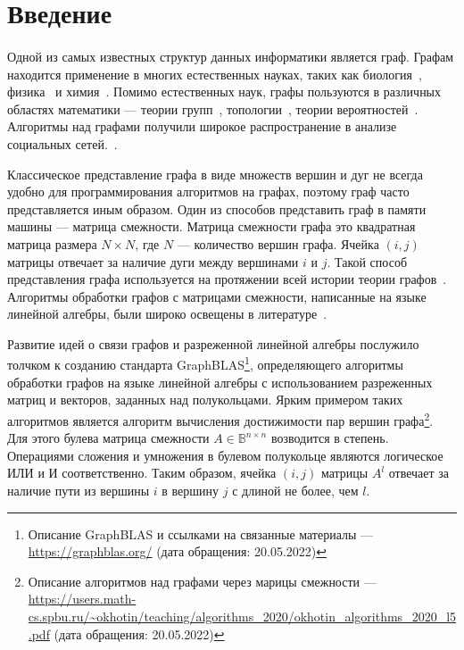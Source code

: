 \documentclass[14pt]{matmex-diploma-custom}
\begin{document}
\maketitle
\tableofcontents

\section*{Введение}
\paragraph{} Одной из самых известных структур данных информатики является граф. Графам находится применение в многих естественных науках, таких как биология~\cite{biology}, физика~\cite{physics} и химия~\cite{chemistry}. Помимо естественных наук, графы пользуются в различных областях математики --- теории групп~\cite{group}, топологии~\cite{topology}, теории вероятностей~\cite{probability}. Алгоритмы над графами получили широкое распространение в анализе социальных сетей.~\cite{social}.

Классическое представление графа в виде множеств вершин и дуг не всегда удобно для программирования алгоритмов на графах, поэтому граф часто представляется иным образом. Один из способов представить граф в памяти машины --- матрица смежности. Матрица смежности графа это квадратная матрица размера $N \times N$, где $N$ --- количество вершин графа. Ячейка $(i, j)$ матрицы отвечает за наличие дуги между вершинами $i$ и $j$. Такой способ представления графа используется на протяжении всей истории теории графов~\cite{Konig}. Алгоритмы обработки графов с матрицами смежности, написанные на языке линейной алгебры, были широко освещены в литературе~\cite{Kepner}.

Развитие идей о связи графов и разреженной линейной алгебры послужило толчком к созданию стандарта GraphBLAS\footnote{Описание GraphBLAS и ссылками на связанные материалы --- \url{https://graphblas.org/} (дата обращения: 20.05.2022)}\cite{Dongarra}, определяющего алгоритмы обработки графов на языке линейной алгебры с использованием разреженных матриц и векторов, заданных над полукольцами. Ярким примером таких алгоритмов является алгоритм вычисления достижимости пар вершин графа\footnote{Описание алгоритмов над графами через марицы смежности --- \url{https://users.math-cs.spbu.ru/~okhotin/teaching/algorithms_2020/okhotin_algorithms_2020_l5.pdf} (дата обращения: 20.05.2022)}. Для этого булева матрица смежности $ A \in \mathbb{B}^{n \times n}$ возводится в степень. Операциями сложения и умножения в булевом полукольце являются логическое ИЛИ и И соответственно. Таким образом, ячейка $(i, j)$ матрицы $A^l$ отвечает за наличие пути из вершины $i$ в вершину $j$ с длиной не более, чем $l$.
\end{document}
